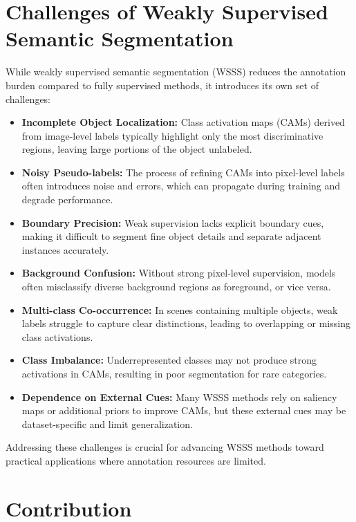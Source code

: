 \section{Challenges of Weakly Supervised Semantic Segmentation}
\label{sec:challenges_of_wsss}

While weakly supervised semantic segmentation (WSSS) reduces the annotation burden compared to fully supervised methods, it introduces its own set of challenges:

\begin{itemize}
    \item \textbf{Incomplete Object Localization:} Class activation maps (CAMs) derived from image-level labels typically highlight only the most discriminative regions, leaving large portions of the object unlabeled.
    \item \textbf{Noisy Pseudo-labels:} The process of refining CAMs into pixel-level labels often introduces noise and errors, which can propagate during training and degrade performance.
    \item \textbf{Boundary Precision:} Weak supervision lacks explicit boundary cues, making it difficult to segment fine object details and separate adjacent instances accurately.
    \item \textbf{Background Confusion:} Without strong pixel-level supervision, models often misclassify diverse background regions as foreground, or vice versa.
    \item \textbf{Multi-class Co-occurrence:} In scenes containing multiple objects, weak labels struggle to capture clear distinctions, leading to overlapping or missing class activations.
    \item \textbf{Class Imbalance:} Underrepresented classes may not produce strong activations in CAMs, resulting in poor segmentation for rare categories.
    \item \textbf{Dependence on External Cues:} Many WSSS methods rely on saliency maps or additional priors to improve CAMs, but these external cues may be dataset-specific and limit generalization.
\end{itemize}

Addressing these challenges is crucial for advancing WSSS methods toward practical applications where annotation resources are limited.


\section{Contribution}
\label{sec:contribution}

